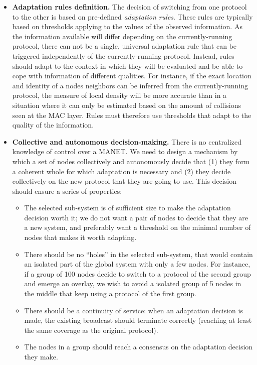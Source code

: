 \begin{itemize}
	\item \textbf{Adaptation rules definition.}
	The decision of switching from one protocol to the other is based on pre-defined \emph{adaptation rules}.
	These rules are typically based on thresholds applying to the values of the observed information.
	As the information available will differ depending on the currently-running protocol, there can not be a single, universal adaptation rule that can be triggered independently of the currently-running protocol.
	Instead, rules should adapt to the context in which they will be evaluated and be able to cope with information of different qualities.
	For instance, if the exact location and identity of a nodes neighbors can be inferred from the currently-running protocol, the measure of local density will be more accurate than in a situation where it can only be estimated based on the amount of collisions seen at the MAC layer.
	Rules must therefore use thresholds that adapt to the quality of the information.

	\item \textbf{Collective and autonomous decision-making.}
	There is no centralized knowledge of control over a MANET.
	We need to design a mechanism by which a set of nodes collectively and autonomously decide that (1) they form a coherent whole for which adaptation is necessary and (2) they decide collectively on the new protocol that they are going to use.
	This decision should ensure a series of properties:
	\begin{itemize}
		\item The selected sub-system is of sufficient size to make the adaptation decision worth it; we do not want a pair of nodes to decide that they are a new system, and preferably want a threshold on the minimal number of nodes that makes it worth adapting.
		\item There should be no ``holes'' in the selected sub-system, that would contain an isolated part of the global system with only a few nodes.
		For instance, if a group of 100 nodes decide to switch to a protocol of the second group and emerge an overlay, we wish to avoid a isolated group of 5 nodes in the middle that keep using a protocol of the first group.
		\item There should be a continuity of service: when an adaptation decision is made, the existing broadcast should terminate correctly (reaching at least the same coverage as the original protocol).
		\item The nodes in a group should reach a consensus on the adaptation decision they make.
	\end{itemize}
	

\end{itemize}
